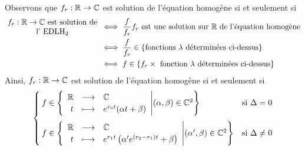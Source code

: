 \documentclass{article}
\begin{document}
\begin{question_kholle}
\begin{itemize}[label=$\star$]
  \end{itemize}
  Observons que $f_{r}:\mathbb R\rightarrow \mathbb C$ est solution de l'équation homogène si et seulement si
  \begin{align*}
    \parbox{12em}{\centering $f_{r}:\R\rightarrow\C$ est solution de l' $\mathrm{EDLH_{2}}$} & \iff	\frac{f}{f_{r}}f_{r} \text{ est une solution sur \R de l'équation homogène}         \\
                                                                                             & \iff \frac{f}{f_{r}} \in \left\{\text{fonctions $\lambda$ déterminées ci-dessus}\right\} \\
                                                                                             & \iff f\in \left\{f_{r} \times \text{ fonction $\lambda$ déterminées ci-dessus}\right\}
  \end{align*}
  Ainsi, $f_{r}:\mathbb R\rightarrow\mathbb C$ est solution de l'équation homogène si et seulement si
  \[
    \begin{cases}
      f\in \left\{\begin{array}{rcl} \mathbb R & \longrightarrow & \mathbb C \\ t & \longmapsto & e^{r_{0}t}(\alpha t+\beta) \end{array} \middle| (\alpha, \beta)\in\mathbb C^{2}\right\}                                 & \text{si $\Delta=0$}     \\[15pt]
      f\in \left\{\begin{array}{rcl} \mathbb R & \longrightarrow & \mathbb C \\ t & \longmapsto & e^{r_{1}t}\left(\alpha ' e^{(r_{2}-r_{1})t}+\beta\right) \end{array} \middle| (\alpha ', \beta)\in\mathbb C^{2}\right\} & \text{si $\Delta\neq 0$}
    \end{cases}
  \]
\end{question_kholle}
\end{document}
